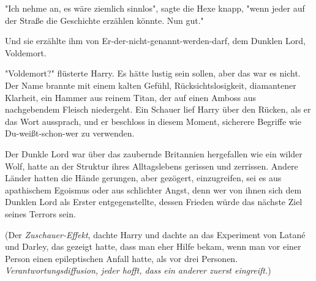 "Ich nehme an, es wäre ziemlich sinnlos", sagte die Hexe knapp, "wenn jeder auf der Straße die Geschichte erzählen könnte. Nun gut."

Und sie erzählte ihm von Er-der-nicht-genannt-werden-darf, dem Dunklen Lord, Voldemort.

"Voldemort?" flüsterte Harry. Es hätte lustig sein sollen, aber das war es nicht. Der Name brannte mit einem kalten Gefühl, Rücksichtslosigkeit, diamantener Klarheit, ein Hammer aus reinem Titan, der auf einen Amboss aus nachgebendem Fleisch niedergeht. Ein Schauer lief Harry über den Rücken, als er das Wort aussprach, und er beschloss in diesem Moment, sicherere Begriffe wie Du-weißt-schon-wer zu verwenden. 

Der Dunkle Lord war über das zaubernde Britannien hergefallen wie ein wilder Wolf, hatte an der Struktur ihres Alltagslebens gerissen und zerrissen.
Andere Länder hatten die Hände gerungen, aber gezögert, einzugreifen, sei es aus apathischem Egoismus oder aus schlichter Angst, denn wer von ihnen sich dem Dunklen Lord als Erster entgegenstellte, dessen Frieden würde das nächste Ziel seines Terrors sein. 

(Der \emph{Zuschauer-Effekt}, dachte Harry und dachte an das Experiment von Latané und Darley, das gezeigt hatte, dass man eher Hilfe bekam, wenn man vor einer Person einen epileptischen Anfall hatte, als vor drei Personen. \emph{Verantwortungsdiffusion, jeder hofft, dass ein anderer zuerst eingreift.}) 

